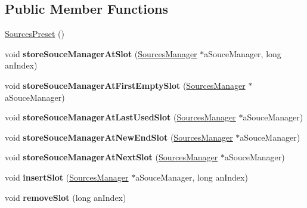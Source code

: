\subsection*{Public Member Functions}
\begin{DoxyCompactItemize}
\item 
\hyperlink{class_sources_preset_a0a4203349327d10bb6afe35156126d8a}{Sources\-Preset} ()
\item 
\hypertarget{class_sources_preset_aa0a656cc68f279b5fbb51b220e1363a5}{void {\bfseries store\-Souce\-Manager\-At\-Slot} (\hyperlink{class_sources_manager}{Sources\-Manager} $\ast$a\-Souce\-Manager, long an\-Index)}\label{class_sources_preset_aa0a656cc68f279b5fbb51b220e1363a5}

\item 
\hypertarget{class_sources_preset_aa3fee4d3cf26ae5fbf5ac50a04f00e61}{void {\bfseries store\-Souce\-Manager\-At\-First\-Empty\-Slot} (\hyperlink{class_sources_manager}{Sources\-Manager} $\ast$a\-Souce\-Manager)}\label{class_sources_preset_aa3fee4d3cf26ae5fbf5ac50a04f00e61}

\item 
\hypertarget{class_sources_preset_ad2cc88ed95f1715358c8f9330ccaf5ab}{void {\bfseries store\-Souce\-Manager\-At\-Last\-Used\-Slot} (\hyperlink{class_sources_manager}{Sources\-Manager} $\ast$a\-Souce\-Manager)}\label{class_sources_preset_ad2cc88ed95f1715358c8f9330ccaf5ab}

\item 
\hypertarget{class_sources_preset_a9ded7bfe5242346d5f6f08e4a77a6e94}{void {\bfseries store\-Souce\-Manager\-At\-New\-End\-Slot} (\hyperlink{class_sources_manager}{Sources\-Manager} $\ast$a\-Souce\-Manager)}\label{class_sources_preset_a9ded7bfe5242346d5f6f08e4a77a6e94}

\item 
\hypertarget{class_sources_preset_ad527bdc87aaa365ef36c70d0027d658d}{void {\bfseries store\-Souce\-Manager\-At\-Next\-Slot} (\hyperlink{class_sources_manager}{Sources\-Manager} $\ast$a\-Souce\-Manager)}\label{class_sources_preset_ad527bdc87aaa365ef36c70d0027d658d}

\item 
\hypertarget{class_sources_preset_a96671f9d3423ce9642ffd7bf5667973e}{void {\bfseries insert\-Slot} (\hyperlink{class_sources_manager}{Sources\-Manager} $\ast$a\-Souce\-Manager, long an\-Index)}\label{class_sources_preset_a96671f9d3423ce9642ffd7bf5667973e}

\item 
\hypertarget{class_sources_preset_ab032da223bf26c364cda0313a3a2f3dd}{void {\bfseries remove\-Slot} (long an\-Index)}\label{class_sources_preset_ab032da223bf26c364cda0313a3a2f3dd}


\end{DoxyCompactItemize}
